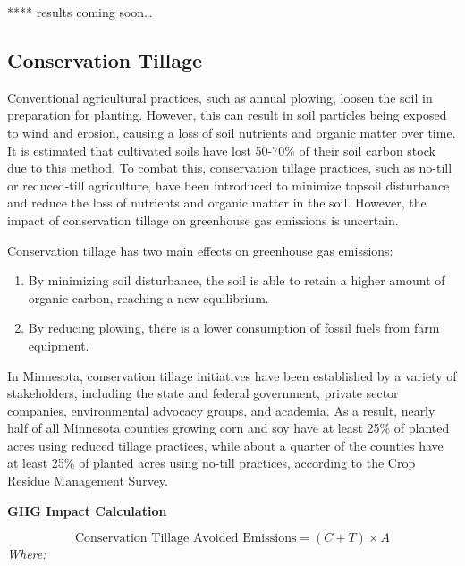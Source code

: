 \documentclass[
]{book}
\providecommand{\tightlist}{%
  \setlength{\itemsep}{0pt}\setlength{\parskip}{0pt}}
\begin{document}
**** results coming soon\ldots{}

\hypertarget{conservation-tillage}{%
\subsection{Conservation Tillage}\label{conservation-tillage}}

Conventional agricultural practices, such as annual plowing, loosen the soil in preparation for planting. However, this can result in soil particles being exposed to wind and erosion, causing a loss of soil nutrients and organic matter over time. It is estimated that cultivated soils have lost 50-70\% of their soil carbon stock due to this method. To combat this, conservation tillage practices, such as no-till or reduced-till agriculture, have been introduced to minimize topsoil disturbance and reduce the loss of nutrients and organic matter in the soil. However, the impact of conservation tillage on greenhouse gas emissions is uncertain.

Conservation tillage has two main effects on greenhouse gas emissions:

\begin{enumerate}
\def\labelenumi{\arabic{enumi})}
\tightlist
\item
  By minimizing soil disturbance, the soil is able to retain a higher amount of organic carbon, reaching a new equilibrium.
\item
  By reducing plowing, there is a lower consumption of fossil fuels from farm equipment.
\end{enumerate}

In Minnesota, conservation tillage initiatives have been established by a variety of stakeholders, including the state and federal government, private sector companies, environmental advocacy groups, and academia. As a result, nearly half of all Minnesota counties growing corn and soy have at least 25\% of planted acres using reduced tillage practices, while about a quarter of the counties have at least 25\% of planted acres using no-till practices, according to the Crop Residue Management Survey.

\textbf{GHG Impact Calculation}

\[ \text{Conservation Tillage Avoided Emissions} = (C+T) × A \]
\emph{Where:}
\end{document}
